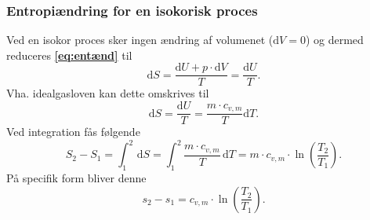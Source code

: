 \subsubsection{Entropiændring for en isokorisk proces}
Ved en isokor proces sker ingen ændring af volumenet ($\mathrm{d}V = 0$) og dermed reduceres \textbf{\autoref{eq:entænd}} til
\[ 
\mathrm{d}S = \frac{\mathrm{d}U + p \cdot \mathrm{d}V}{T} = \frac{\mathrm{d}U}{T}
.\]
Vha. idealgasloven kan dette omskrives til
\[ 
\mathrm{d}S = \frac{\mathrm{d}U}{T} = \frac{m \cdot c_{v,m}}{T} \mathrm{d}T
.\]
Ved integration fås følgende
\[ 
S_2 - S_1 = \int_{1}^{2} \, \mathrm{d}S = \int_{1}^{2} \frac{m \cdot c_{v,m}}{T} \, \mathrm{d}T = m \cdot c_{v,m} \cdot \ln \left( \frac{T_2}{T_1} \right)
.\]
På specifik form bliver denne
\[ 
s_2 - s_1 = c_{v,m} \cdot \ln \left( \frac{T_2}{T_1} \right)
.\]

